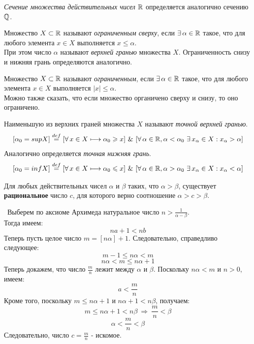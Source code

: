 \begin{definition}
    \textit{Сечение множества действительных чисел \(\mathbb{R}\)} определяется 
    аналогично сечению \(\mathbb{Q}\).
\end{definition}

\begin{definition}
    Множество \(X\subset\mathbb{R}\) называют \textit{ограниченным сверху}, 
    если \(\exists\,\alpha\in\mathbb{R}\) такое, что для любого элемента \(x\in X\)
    выполняется \(x\leq\alpha\). \\
    При этом число \(\alpha\) называют \textit{верхней гранью} множества \(X\).
    Ограниченность снизу и нижняя грань определяются аналогично.
    
    \vspace{2mm} 

    Множество \(X\subset\mathbb{R}\) называют \textit{ограниченным}, 
    если \(\exists\,\alpha\in\mathbb{R}\) такое, что для любого элемента \(x\in X\)
    выполняется \(|x|\leq\alpha\). \\
    Можно также сказать, что если множество органичено сверху и снизу, то оно ограничено.
\end{definition}

\begin{definition}
    Наименьшую из верхних граней множества \(X\) называют \textit{точной верхней гранью}.
    \[[\alpha_{0} = sup X]\overset{def}{=}[\forall\,x\in X\longmapsto\alpha_{0}\geqslant x]
    ~\&~[\forall\,\alpha\in\mathbb{R}, \alpha<\alpha_{0}~\exists\,x_{\alpha}\in X:x_{\alpha}>\alpha]\]
    Аналогично определяется \textit{точная нижняя грань}.
    \[[\alpha_{0} = inf X]\overset{def}{=}[\forall\,x\in X\longmapsto\alpha_{0}\leqslant x]
    ~\&~[\forall\,\alpha\in\mathbb{R}, \alpha>\alpha_{0}~\exists\,x_{\alpha}\in X:x_{\alpha}<\alpha]\]
\end{definition} 

\begin{lemma}
    Для любых действительных чисел \(\alpha\) и \(\beta\) таких, что \(\alpha>\beta\), существует 
    \textbf{рациональное} число \(c\), для которого верно соотношение \(\alpha>c>\beta\).

    \vspace{2mm}

    \proofname~Выберем по аксиоме Архимеда натуральное число \(n > \frac{1}{\alpha-\beta}\). \\
    Тогда имеем: \[na+1<nb\] 
    Теперь пусть целое число \(m = [n\alpha]+1\). Следовательно, справедливо следующее:
    \[m-1\leq n\alpha < m\]
    \[n\alpha < m \leq n\alpha + 1\]
    Теперь докажем, что число \(\frac{m}{n}\) лежит между \(\alpha\) и \(\beta\).
    Поскольку \(n\alpha < m\) и \(n > 0\), имеем: \[a < \frac{m}{n}\]
    Кроме того, поскольку \(m \leq n\alpha + 1\) и \(n\alpha + 1 < n\beta\), получаем:
    \[m \leq n\alpha + 1 < n\beta ~ \Rightarrow ~ \frac{m}{n} < \beta\]
    \[\alpha < \frac{m}{n} < \beta\]
    Следовательно, число \(c = \frac{m}{n}\) - искомое.~\qedsymbol
\end{lemma}

